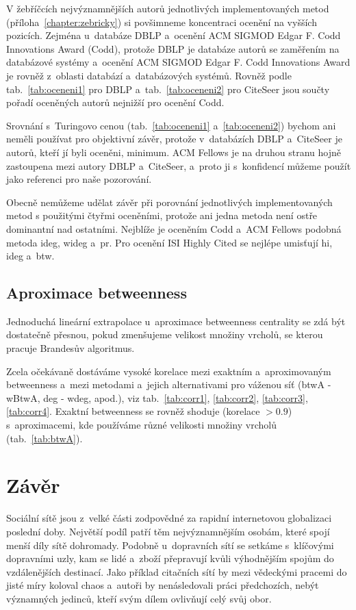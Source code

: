 \documentclass{bakalarka}
\begin{document}
V žebříčcích nejvýznamnějších autorů jednotlivých implementovaných metod
(příloha~\ref{chapter:zebricky}) si povšimneme koncentraci ocenění na vyšších
pozicích. Zejména u~databáze DBLP a~ocenění ACM SIGMOD Edgar F. Codd
Innovations Award (Codd), protože DBLP je databáze autorů se zaměřením na
databázové systémy a~ocenění ACM SIGMOD Edgar F. Codd Innovations Award je
rovněž z~oblasti databází a~databázových systémů. Rovněž podle
tab.~\ref{tab:oceneni1} pro DBLP a~tab.~\ref{tab:oceneni2} pro CiteSeer jsou
součty pořadí oceněných autorů nejnižší pro ocenění Codd.

Srovnání s~Turingovo cenou (tab.~\ref{tab:oceneni1} a~\ref{tab:oceneni2})
bychom ani neměli používat pro objektivní závěr, protože v~databázích DBLP
a~CiteSeer je autorů, kteří jí byli oceněni, minimum. ACM Fellows je na druhou
stranu hojně zastoupena mezi autory DBLP a~CiteSeer, a~proto ji s~konfidencí
můžeme použít jako referenci pro naše pozorování.

Obecně nemůžeme udělat závěr při porovnání jednotlivých implementovaných metod
s použitými čtyřmi oceněními, protože ani jedna metoda není ostře dominantní
nad ostatními. Nejblíže je oceněním Codd a~ACM Fellows podobná metoda ideg,
wideg a~pr. Pro ocenění ISI Highly Cited se nejlépe umisťují hi, ideg a~btw.


\section{Aproximace betweenness}
Jednoduchá lineární extrapolace u~aproximace betweenness centrality se zdá být
dostatečně přesnou, pokud zmenšujeme velikost množiny vrcholů, se kterou
pracuje Brandesův algoritmus.

Zcela očekávaně dostáváme vysoké korelace mezi exaktním a~aproximovaným
betweenness a~mezi metodami a~jejich alternativami pro váženou síť (btwA -
wBtwA, deg - wdeg, apod.), viz tab.~\ref{tab:corr1}, \ref{tab:corr2},
\ref{tab:corr3}, \ref{tab:corr4}. Exaktní betweenness se rovněž shoduje
(korelace $> 0.9$) s~aproximacemi, kde používáme různé velikosti množiny
vrcholů (tab.~\ref{tab:btwA}).

\chapter{Závěr}
Sociální sítě jsou z~velké části zodpovědné za rapidní internetovou globalizaci
poslední doby. Největší podíl patří těm nejvýznamnějším osobám, které spojí
menší díly sítě dohromady. Podobně u~dopravních sítí se setkáme s~klíčovými
dopravními uzly, kam se lidé a~zboží přepravují kvůli výhodnějším spojům do
vzdálenějších destinací. Jako příklad citačních sítí by mezi vědeckými pracemi
do jisté míry koloval chaos a~autoři by nenásledovali práci předchozích, nebýt
významných jedinců, kteří svým dílem ovlivňují celý svůj obor.
\end{document}

